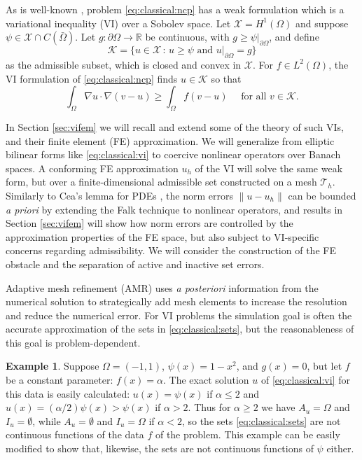 \documentclass[]{interact}
\theoremstyle{plain}%
\theoremstyle{definition}
\newtheorem{example}[theorem]{Example}
\theoremstyle{remark}
\newcommand{\RR}{\mathbb{R}}
\newcommand{\cK}{\mathcal{K}}
\newcommand{\cT}{\mathcal{T}}
\newcommand{\cX}{\mathcal{X}}
\begin{document}
As is well-known \cite{KinderlehrerStampacchia1980}, problem \eqref{eq:classical:ncp} has a weak formulation which is a variational inequality (VI) over a Sobolev space.  Let $\cX=H^1(\Omega)$ \cite{ElmanSilvesterWathen2014} and suppose $\psi \in \cX \cap C(\bar\Omega)$.  Let $g:\partial \Omega\to \RR$ be continuous, with $g\ge\psi|_{\partial \Omega}$, and define
\begin{equation} \label{eq:classical:admissible}
\cK = \{u \in \cX \,:\, u \ge \psi \text{ and } u|_{\partial \Omega} = g\}
\end{equation}
as the admissible subset, which is closed and convex in $\cX$.  For $f\in L^2(\Omega)$, the VI formulation of \eqref{eq:classical:ncp} finds $u\in \cK$ so that
\begin{equation} \label{eq:classical:vi}
\int_\Omega \nabla u \cdot \nabla(v - u) \ge \int_\Omega f(v - u) \quad \text{ for all } v \in \cK.
\end{equation}

In Section \ref{sec:vifem} we will recall and extend some of the theory of such VIs, and their finite element (FE) approximation.  We will generalize from elliptic bilinear forms like \eqref{eq:classical:vi} to coercive nonlinear operators over Banach spaces.  A conforming FE approximation $u_h$ of the VI will solve the same weak form, but over a finite-dimensional admissible set constructed on a mesh $\cT_h$.  Similarly to Cea's lemma for PDEs \cite{ElmanSilvesterWathen2014}, the norm errors $\|u-u_h\|$ can be bounded \emph{a priori} by extending the Falk \cite{Falk1974} technique to nonlinear operators, and results in Section \ref{sec:vifem} will show how norm errors are controlled by the approximation properties of the FE space, but also subject to VI-specific concerns regarding admissibility.  We will consider the construction of the FE obstacle and the separation of active and inactive set errors.

Adaptive mesh refinement (AMR) uses \emph{a posteriori} information from the numerical solution to strategically add mesh elements to increase the resolution and reduce the numerical error.  For VI problems the simulation goal is often the accurate approximation of the sets in \eqref{eq:classical:sets}, but the reasonableness of this goal is problem-dependent.

\begin{example} \label{example:notcontinuous}  Suppose $\Omega = (-1,1)$, $\psi(x)=1 - x^2$, and $g(x)=0$, but let $f$ be a constant parameter: $f(x)=\alpha$.  The exact solution $u$ of \eqref{eq:classical:vi} for this data is easily calculated: $u(x)=\psi(x)$ if $\alpha\le 2$ and $u(x)=(\alpha/2)\psi(x)>\psi(x)$ if $\alpha>2$.  Thus for $\alpha \ge 2$ we have $A_u=\Omega$ and $I_u=\emptyset$, while $A_u=\emptyset$ and $I_u=\Omega$ if $\alpha<2$, so the sets \eqref{eq:classical:sets} are not continuous functions of the data $f$ of the problem.  This example can be easily modified to show that, likewise, the sets are not continuous functions of $\psi$ either.
\end{example}
\end{document}
